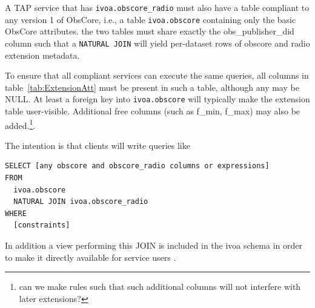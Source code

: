 \documentclass[11pt,a4paper]{ivoa}
\begin{document}
A TAP service that has \verb|ivoa.obscore_radio| must also have a table
compliant to any version 1 of ObsCore, i.e., a table
\verb|ivoa.obscore| containing only the basic ObsCore attributes.
the two tables must share exactly the obs\_publisher\_did 
column such
that a \verb|NATURAL JOIN| will yield per-dataset rows of obscore and
radio extension metadata.  

To ensure that all compliant services can execute the same queries,
all columns in table~\ref{tab:ExtensionAtt} must be present in such a
table, although any may be NULL. At least a foreign key into \verb|ivoa.obscore| will typically
make the extension table user-visible. Additional free columns (such as f\_min, f\_max) may also
be added.\footnote{can we make rules such that such additional columns
will not interfere with later extensions?}.

The intention is that clients will write queries like
\begin{lstlisting}
SELECT [any obscore and obscore_radio columns or expressions]
FROM
  ivoa.obscore
  NATURAL JOIN ivoa.obscore_radio
WHERE
  [constraints]
\end{lstlisting}

In addition a view performing this JOIN is included in the ivoa schema in
order to make it directly available for service users . 

%
%
%
%
%
\end{document}
